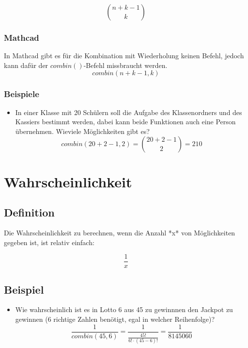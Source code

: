 \documentclass[a4paper,10pt]{article}
\begin{document}
\begin{equation}
  \label{eq:15}
  \binom{n + k - 1}{k}
\end{equation}

\subsubsection{Mathcad}
In Mathcad gibt es für die Kombination mit Wiederholung keinen Befehl,
jedoch kann dafür der $combin()$-Befehl missbraucht werden.
\begin{equation}
  \label{eq:16}
  combin(n + k - 1, k)
\end{equation}

\subsubsection{Beispiele}
\begin{itemize}
\item {
    In einer Klasse mit 20 Schülern soll die Aufgabe des
    Klassenordners und des Kassiers bestimmt werden, dabei kann beide
    Funktionen auch eine Person übernehmen. Wieviele Möglichkeiten
    gibt es?
    \begin{equation}
      \label{eq:17}
      combin(20 + 2 - 1, 2) = \binom{20 + 2 - 1}{2} = 210
    \end{equation}
  }
\end{itemize}

\section{Wahrscheinlichkeit}
\subsection{Definition}
Die Wahrscheinlichkeit zu berechnen, wenn die Anzahl *x* von
Möglichkeiten gegeben ist, ist relativ einfach:

\begin{equation}
  \label{eq:9}
  \frac{1}{x}
\end{equation}

\subsection{Beispiel}
\begin{itemize}
\item {
    Wie wahrscheinlich ist es in Lotto 6 aus 45 zu gewinnnen den
    Jackpot zu gewinnen (6 richtige Zahlen benötigt, egal in welcher
    Reihenfolge)?
    \begin{equation}
      \label{eq:10}
      \frac{1}{combin(45, 6)} = \frac{1}{\frac{45!}{6! \cdot (45 - 6)!}} = \frac{1}{8145060}
    \end{equation}
  }
\end{itemize}
\end{document}
